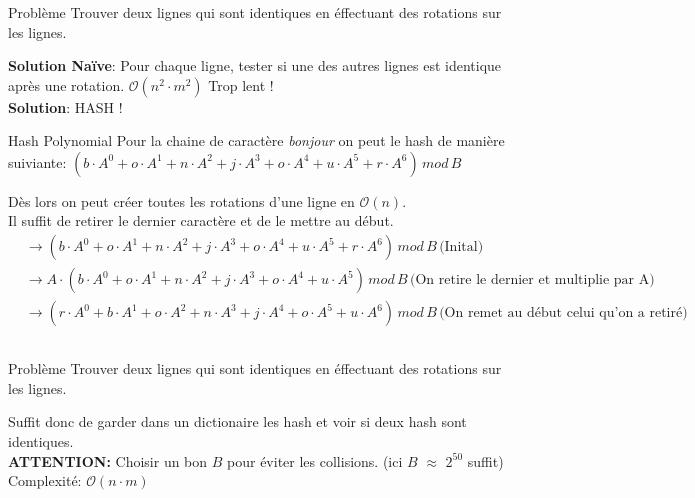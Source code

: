 \begin{frame}
    \frametitle{\problemtitle}
        \begin{block}
            {Problème} Trouver deux lignes qui sont identiques en éffectuant des rotations sur les lignes.
        \end{block}
        \pause
        \textbf{Solution Naïve}: Pour chaque ligne, tester si une des autres lignes est identique après une rotation. $\mathcal O(n^2 \cdot m^2)$ Trop lent !\\
        \pause
        \textbf{Solution}: HASH !
        \begin{block} {Hash Polynomial}
            Pour la chaine de caractère \textit{bonjour} on peut le hash de manière suiviante:
            $(b \cdot A^0 + o \cdot A^1 + n \cdot A^2 + j \cdot A^3 + o \cdot A^4 + u \cdot A^5 + r \cdot A^6) \, mod \, B$
        \end{block}
        \pause
        Dès lors on peut créer toutes les rotations d'une ligne en $\mathcal O(n)$.\\
        Il suffit de retirer le dernier caractère et de le mettre au début.
        \pause
        \begin{align*}
           &\rightarrow (b \cdot A^0 + o \cdot A^1 + n \cdot A^2 + j \cdot A^3 + o \cdot A^4 + u \cdot A^5 + r \cdot A^6) \, mod \, B \,\text{(Inital)}\\ 
           &\rightarrow A \cdot (b \cdot A^0 + o \cdot A^1 + n \cdot A^2 + j \cdot A^3 + o \cdot A^4 + u \cdot A^5) \, mod \, B\, \text{(On retire le dernier et multiplie par A)}\\
           &\rightarrow (r \cdot A^0 + b \cdot A^1 + o \cdot A^2 + n \cdot A^3 + j \cdot A^4 + o \cdot A^5 + u \cdot A^6) \, mod \, B\, \text{(On remet au début celui qu'on a retiré)}\\ 
        \end{align*}
        \pause
\end{frame}
\begin{frame}
    \frametitle{\problemtitle}
        \begin{block}
            {Problème} Trouver deux lignes qui sont identiques en éffectuant des rotations sur les lignes.
        \end{block}
    Suffit donc de garder dans un dictionaire les hash et voir si deux hash sont identiques.\\
    \textbf{ATTENTION:} Choisir un bon $B$ pour éviter les collisions. (ici $B$ $\approx$ $2^{50}$ suffit)\\
    \pause
    Complexité: $\mathcal O(n \cdot m)$
\end{frame}
